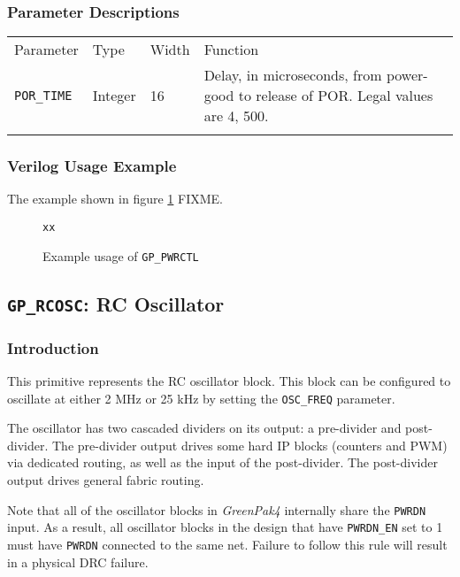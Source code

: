 \documentclass[11pt]{article}
\newcommand{\namestyle}[1]{\textit{#1}}
\newcommand{\tokenstyle}[1]{\texttt{#1}}
\newcommand{\whenstyle}[1]{{\fontseries{sb}\selectfont#1}}
\newcommand{\thinhline}{\Xhline{1\arrayrulewidth}}
\newcommand{\thickhline}{\Xhline{2.5\arrayrulewidth}}
\begin{document}
\subsubsection{Parameter Descriptions}

\begin{tabularx}{\textwidth}{lllX}
\thinhline
\whenstyle{Parameter} & \whenstyle{Type} & \whenstyle{Width} & \whenstyle{Function} \\
\thickhline
\tokenstyle{POR\_TIME} & Integer & 16 & Delay, in microseconds, from power-good to release of POR. Legal values are 4, 500.\\
\thinhline
\end{tabularx}

\subsubsection{Verilog Usage Example}

The example shown in figure \ref{gp-pwrctl-example} FIXME.

\begin{figure}[h]
\begin{lstlisting}
xx
\end{lstlisting}
\caption{Example usage of \tokenstyle{GP\_PWRCTL}}
\label{gp-pwrctl-example}
\end{figure}


\pagebreak
\subsection{\tokenstyle{GP\_RCOSC}: RC Oscillator}
\label{gp-rcosc}

\subsubsection{Introduction}
This primitive represents the RC oscillator block. This block can be configured to oscillate at either 2 MHz or 25 kHz
by setting the \tokenstyle{OSC\_FREQ} parameter.

The oscillator has two cascaded dividers on its output: a pre-divider and post-divider. The pre-divider output drives
some hard IP blocks (counters and PWM) via dedicated routing, as well as the input of the post-divider. The
post-divider output drives general fabric routing.

Note that all of the oscillator blocks in \namestyle{GreenPak4} internally share the \tokenstyle{PWRDN} input. As a result, all oscillator blocks in the design that have \tokenstyle{PWRDN\_EN} set to 1 must have \tokenstyle{PWRDN} connected to the same net. Failure to follow this rule will result in a physical DRC failure.
\end{document}
